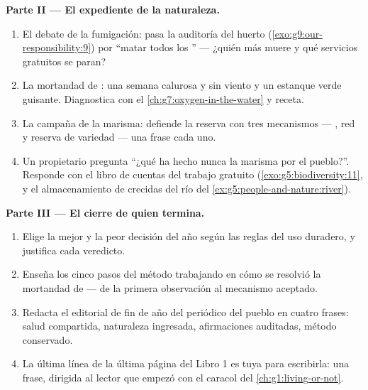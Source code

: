 \begin{problem}
\medskip\noindent\textbf{Parte II --- El expediente de la naturaleza.}
\begin{enumerate}[resume]
  \item El debate de la fumigación: pasa la auditoría del huerto
        (\cref{exo:g9:our-responsibility:9}) por ``matar todos los
        '' --- ¿quién más muere y qué servicios gratuitos se
        paran?
  \item La mortandad de : una semana calurosa y sin viento y un
        estanque verde guisante. Diagnostica con el
        \cref{ch:g7:oxygen-in-the-water} y receta.
  \item La campaña de la marisma: defiende la reserva con tres
        mecanismos --- , red y reserva de variedad --- una frase
        cada uno.
  \item Un propietario pregunta ``¿qué ha hecho nunca la marisma por el
        pueblo?''. Responde con el libro de cuentas del trabajo
        gratuito (\cref{exo:g5:biodiversity:11}, y el almacenamiento de
        crecidas del río del \cref{ex:g5:people-and-nature:river}).
\end{enumerate}

\medskip\noindent\textbf{Parte III --- El cierre de quien
termina.}
\begin{enumerate}[resume]
  \item Elige la mejor y la peor decisión del año según las reglas del
        uso duradero, y justifica cada veredicto.
  \item Enseña los cinco pasos del método trabajando en cómo se
        resolvió la mortandad de  --- de la primera observación al
        mecanismo aceptado.
  \item Redacta el editorial de fin de año del periódico del pueblo en
        cuatro frases: salud compartida, naturaleza ingresada,
        afirmaciones auditadas, método conservado.
  \item La última línea de la última página del Libro 1 es tuya para
        escribirla: una frase, dirigida al lector que empezó con el
        caracol del \cref{ch:g1:living-or-not}.
\end{enumerate}
\end{problem}
